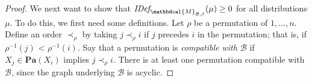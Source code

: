 \documentclass[letterpaper]{article} %
\theoremstyle{plain}
\theoremstyle{definition}
\theoremstyle{remark}
\newcommand{\dg}[1]{\mathbdcal{#1}}
\newcommand\Pa{\mathbf{Pa}}
\newcommand{\IDef}[1]{\mathit{IDef}_{\!#1}}
\newcommand{\PDGof}[1]{{\dg M}_{#1}}
\begin{document}
\begin{proof}
We next want to show  that $\IDef{\PDGof{\mathcal B,\beta}}(\mu) \ge 0$ for all
distributions $\mu$.  To do this, we first need some definitions.
Let $\rho$ be a permutation of $1, \ldots,  n$.  Define an order
$\prec_{\rho}$ by taking $j \prec_{\rho} i$ if $j$ precedes $i$ in the
permutation; that is, if 
$\rho^{-1}(j)$ < $\rho^{-1}(i)$. Say that a permutation is \emph{compatible with
  $\mathcal B$} if $X_j \in \Pa(X_i)$ implies $j \prec_{\rho} i$.   There
is at least one permutation compatible with $\mathcal B$, since 
the graph underlying $\mathcal B$ is acyclic.
  

\end{proof}
\end{document}
